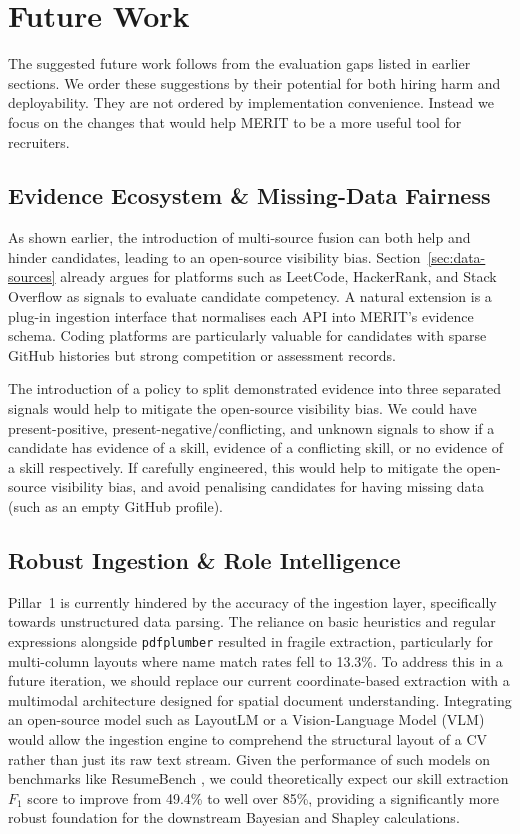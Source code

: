 \section{Future Work}
\label{sec:future-work-roadmap}

The suggested future work follows from the evaluation gaps listed in earlier sections. We order these suggestions by their potential for
both hiring harm and deployability. They are not ordered by implementation convenience. Instead we focus on the changes that would help
MERIT to be a more useful tool for recruiters.

\subsection{Evidence Ecosystem \& Missing-Data Fairness}
\label{subsec:future-evidence-ecosystem}

As shown earlier, the introduction of multi-source fusion can both help and hinder candidates, leading to an open-source visibility bias.
Section~\ref{sec:data-sources} already argues for platforms such as LeetCode, HackerRank, and Stack Overflow as signals
to evaluate candidate competency. A natural extension is a plug-in ingestion interface that normalises each API into MERIT's evidence schema. 
Coding platforms are particularly valuable for candidates with sparse GitHub histories but strong competition or assessment records.

The introduction of a policy to split demonstrated evidence into three separated signals would help to mitigate the open-source visibility bias.
We could have present-positive, present-negative/conflicting, and unknown signals to show if a candidate has evidence of a skill, evidence of a conflicting skill, 
or no evidence of a skill respectively. If carefully engineered, this would help to mitigate the open-source visibility bias, and avoid
penalising candidates for having missing data (such as an empty GitHub profile).

\subsection{Robust Ingestion \& Role Intelligence}
\label{subsec:future-ingestion}

Pillar~1 is currently hindered by the accuracy of the ingestion layer, specifically towards unstructured data parsing.
The reliance on basic heuristics and regular expressions alongside \texttt{pdfplumber} \cite{pdfplumber} resulted in 
fragile extraction, particularly for multi-column layouts where name match rates fell to 13.3\%. To address this 
in a future iteration, we should replace our current coordinate-based extraction with a multimodal architecture 
designed for spatial document understanding. Integrating an open-source model such as LayoutLM or a Vision-Language 
Model (VLM) would allow the ingestion engine to comprehend the structural layout of a CV rather than just its raw text stream.
Given the performance of such models on benchmarks like ResumeBench \cite{emnlp2025resumebench}, we could 
theoretically expect our skill extraction $F_1$ score to improve from 49.4\% to well over 85\%, providing a 
significantly more robust foundation for the downstream Bayesian and Shapley calculations.

